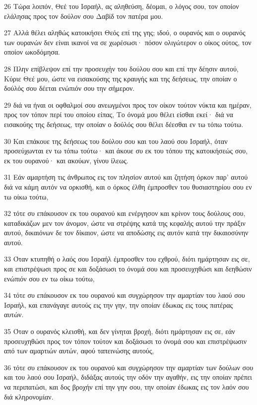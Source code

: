 \par 26 Τώρα λοιπόν, Θεέ του Ισραήλ, ας αληθεύση, δέομαι, ο λόγος σου, τον οποίον ελάλησας προς τον δούλον σου Δαβίδ τον πατέρα μου.
\par 27 Αλλά θέλει αληθώς κατοικήσει Θεός επί της γης; ιδού, ο ουρανός και ο ουρανός των ουρανών δεν είναι ικανοί να σε χωρέσωσι· πόσον ολιγώτερον ο οίκος ούτος, τον οποίον ωκοδόμησα.
\par 28 Πλην επίβλεψον επί την προσευχήν του δούλου σου και επί την δέησιν αυτού, Κύριε Θεέ μου, ώστε να εισακούσης της κραυγής και της δεήσεως, την οποίαν ο δούλός σου δέεται ενώπιόν σου την σήμερον.
\par 29 διά να ήναι οι οφθαλμοί σου ανεωγμένοι προς τον οίκον τούτον νύκτα και ημέραν, προς τον τόπον περί του οποίου είπας, Το όνομά μου θέλει είσθαι εκεί· διά να εισακούης της δεήσεως, την οποίαν ο δούλός σου θέλει δέεσθαι εν τω τόπω τούτω.
\par 30 Και επάκουε της δεήσεως του δούλου σου και του λαού σου Ισραήλ, όταν προσεύχωνται εν τω τόπω τούτω· και άκουε συ εκ του τόπου της κατοικήσεώς σου, εκ του ουρανού· και ακούων, γίνου ίλεως.
\par 31 Εάν αμαρτήση τις άνθρωπος εις τον πλησίον αυτού και ζητήση όρκον παρ' αυτού διά να κάμη αυτόν να ορκισθή, και ο όρκος έλθη έμπροσθεν του θυσιαστηρίου σου εν τω οίκω τούτω,
\par 32 τότε συ επάκουσον εκ του ουρανού και ενέργησον και κρίνον τους δούλους σου, καταδικάζων μεν τον άνομον, ώστε να στρέψης κατά της κεφαλής αυτού την πράξιν αυτού, δικαιόνων δε τον δίκαιον, ώστε να αποδώσης εις αυτόν κατά την δικαιοσύνην αυτού.
\par 33 Όταν κτυπηθή ο λαός σου Ισραήλ έμπροσθεν του εχθρού, διότι ημάρτησαν εις σε, και επιστρέψωσι προς σε και δοξάσωσι το όνομά σου και προσευχηθώσι και δεηθώσιν ενώπιόν σου εν τω οίκω τούτω,
\par 34 τότε συ επάκουσον εκ του ουρανού και συγχώρησον την αμαρτίαν του λαού σου Ισραήλ, και επανάγαγε αυτούς εις την γην, την οποίαν έδωκας εις τους πατέρας αυτών.
\par 35 Όταν ο ουρανός κλεισθή, και δεν γίνηται βροχή, διότι ημάρτησαν εις σε, εάν προσευχηθώσι προς τον τόπον τούτον και δοξάσωσι το όνομά σου και επιστρέψωσιν από των αμαρτιών αυτών, αφού ταπεινώσης αυτούς,
\par 36 τότε συ επάκουσον εκ του ουρανού και συγχώρησον την αμαρτίαν των δούλων σου και του λαού σου Ισραήλ, διδάξας αυτούς την οδόν την αγαθήν, εις την οποίαν πρέπει να περιπατώσι, και δος βροχήν επί την γην σου, την οποίαν έδωκας εις τον λαόν σου διά κληρονομίαν.
